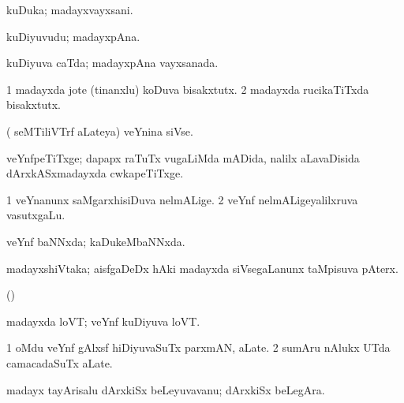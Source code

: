 {{{{{{\bentry
{}
  \gl{\nA}\bmng
kuDuka; madayxvayxsani. 
\emng
\eentry

\bentry
{} 
\gl{\nA}
\expl{}
\bmng
kuDiyuvudu; madayxpAna. 
\emng
\eentry

\bentry
{} 
\gl{\gu}
\expl{}
\bmng
kuDiyuva caTda; madayxpAna vayxsanada. 
\emng
\eentry

\bentry
{}
  \gl{\nA}\bmng
\bnum
\num{1} madayxda jote (tinanxlu) koDuva bisakxtutx. 
\num{2} madayxda rucikaTiTxda bisakxtutx. 
\enum
\emng
\eentry

\bentry
{} 
\gl{\nA}
\expl{}
\bmng
( seMTiliVTrf aLateya) veYnina siVse. 
\emng
\eentry

\bentry
{}
 \gl{\nA}\bmng
veYnfpeTiTxge; dapapx raTuTx \mo vugaLiMda mADida, nalilx aLavaDisida dArxkASxmadayxda cwkapeTiTxge. 
\emng
\eentry

\bentry
{}
 \gl{\nA}\bmng
\bnum
\num{1} veYnanunx saMgarxhisiDuva nelmALige. 
\num{2} veYnf nelmALigeyalilxruva vasutxgaLu. 
\enum
\emng
\eentry

\bentry
{}
  \gl{\gu}\bmng
veYnf baNNxda; kaDukeMbaNNxda. 
\emng
\eentry

\bentry
{}
  \gl{\nA}\bmng
madayxshiVtaka; aisfgaDeDx hAki madayxda siVsegaLanunx taMpisuva pAterx. 
\emng
\eentry

\bentry
{} 
\gl{\nA}
\expl{}
\bmng
(\pArxparx)  
\emng
\eentry

\bentry
{}
\gl{\nA}
\bmng
madayxda loVT; veYnf kuDiyuva loVT. 
\emng
\eentry

\bentry
{}
\gl{\nA}
\bmng
\bnum
\num{1} oMdu veYnf gAlxsf hiDiyuvaSuTx parxmAN, aLate. 
\num{2} sumAru nAlukx UTda camacadaSuTx aLate. 
\enum
\emng
\eentry

\bentry
{}
  \gl{\nA}\bmng
{} 
\emng
\eentry

\bentry
{}
  \gl{\nA}\bmng
madayx tayArisalu dArxkiSx beLeyuvavanu; dArxkiSx beLegAra. 
\emng
\eentry

}}}}}}
